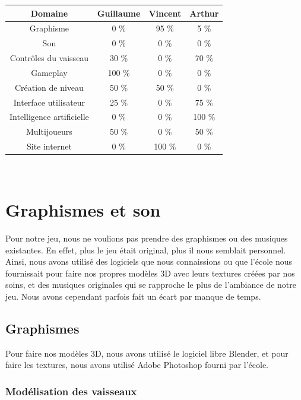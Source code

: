 \documentclass[12pt, titlepage]{article}
\begin{document}
\begin{spacing}{1.5}
\begin{center}
\begin{tabular}{|c|c|c|c|}
\hline
Domaine & Guillaume & Vincent & Arthur\\
\hline
Graphisme & 0 \% & 95 \% & 5 \%\\
\hline
Son & 0 \% & 0 \% & 0 \% \\
\hline
Contrôles du vaisseau & 30 \% & 0 \% & 70  \%\\
\hline
Gameplay & 100 \% & 0 \% & 0 \%\\
\hline
Création de niveau & 50 \% & 50 \% & 0 \%\\
\hline
Interface utilisateur & 25 \% & 0 \% & 75 \%\\
\hline
Intelligence artificielle & 0 \% & 0 \% & 100 \%\\
\hline
Multijoueurs & 50 \% & 0 \% & 50 \%\\
\hline
Site internet & 0 \% & 100 \% & 0 \%\\
\hline
\end{tabular}\\
\end{center}

\newpage
\section{Graphismes et son}

Pour notre jeu, nous ne voulions pas prendre des graphismes ou des musiques existantes. En effet, plus le jeu était original, plus il nous semblait personnel. Ainsi, nous avons utilisé des logiciels que nous connaissions ou que l'école nous fournissait pour faire nos propres modèles 3D avec leurs textures créées par nos soins, et des musiques originales qui se rapproche le plus de l'ambiance de notre jeu. Nous avons cependant parfois fait un écart par manque de temps.\\

\subsection{Graphismes}

Pour faire nos modèles 3D, nous avons utilisé le logiciel libre Blender, et pour faire les textures, nous avons utilisé Adobe Photoshop fourni par l'école.\\

\subsubsection{Modélisation des vaisseaux}


\end{spacing}
\end{document}
